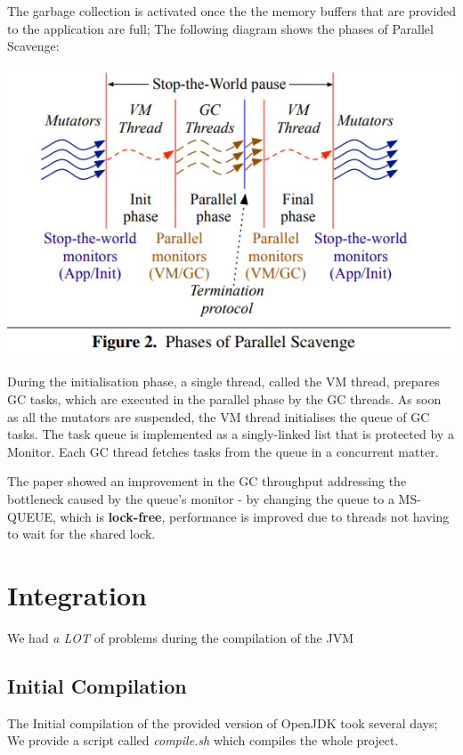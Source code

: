 \documentclass{article}
\begin{document}
  The garbage collection is activated once the the memory buffers that are provided to the application are full; The following diagram shows the phases of Parallel Scavenge:

  \includegraphics[width=\textwidth]{gc_phases.png}

  During the initialisation phase, a single thread, called the VM thread, prepares GC tasks, which are executed in the parallel phase by the GC threads.
  As soon as all the mutators are suspended, the VM thread initialises the queue of GC tasks. The task queue is implemented as a singly-linked list that is protected by a Monitor.
  Each GC thread fetches tasks from the queue in a concurrent matter. 
  
  The paper showed an improvement in the GC throughput addressing the bottleneck caused by the queue's monitor - by changing the queue to a MS-QUEUE, which is \textbf{lock-free}, performance is improved due to threads not having to wait for the shared lock.

  \newpage

  \section{Integration}
  We had \textit{a LOT} of problems during the compilation of the JVM

  \subsection{Initial Compilation}
  The Initial compilation of the provided version of OpenJDK took several days; We provide a script called \textit{compile.sh} which compiles the whole project.
  
\end{document}
